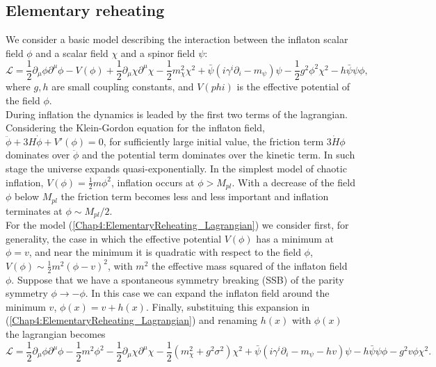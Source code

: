 \documentclass[11pt,a4paper,twoside]{book}
\begin{document}
\subsection{Elementary reheating}
We consider a basic model describing the interaction between the inflaton scalar field $\phi$ and a scalar field 	$\chi$ and a spinor field $\psi$:
\begin{equation}
	\label{Chap4:ElementaryReheating_Lagrangian}
	\mathcal{L}=\frac{1}{2}\partial_{\mu}\phi\partial^{\mu}{\phi} - V(\phi) +\frac{1}{2}\partial_{\mu}\chi\partial^{\mu}\chi -\frac{1}{2}m^{2}_{\chi}\chi^{2} + \bar{\psi}(i\gamma^{i}\partial_{i} - m_{\psi})\psi - \frac{1}{2}g^{2}\phi^{2}\chi^{2} - h\bar{\psi}\psi \phi,
\end{equation} 
where $ g,h $ are small coupling constants, and $ V(phi) $ is the effective potential of the field $\phi$. \\
During inflation the dynamics is leaded by the first two terms of the lagrangian. Considering the Klein-Gordon equation  for the inflaton field, $ \ddot{\phi} + 3H\dot{\phi} + V'(\phi) = 0 $, for sufficiently large initial value, the friction term $ 3\dot{H}\phi $ dominates over $\ddot{\phi}$ and the potential term dominates over the kinetic term. In such stage the universe expands quasi-exponentially. In the simplest model of chaotic inflation, $ V(\phi)=\frac{1}{2}m\phi^{2} $, inflation occurs at $\phi > M_{pl}$. With a decrease of the field $ \phi $ below $ M_{pl} $ the friction term becomes less and less important and inflation terminates at $ \phi \sim M_{pl}/2 $.\\
For the model (\ref{Chap4:ElementaryReheating_Lagrangian}) we consider first, for generality, the case in which the effective potential $ V(\phi) $ has a minimum at $ \phi = v $, and near the minimum it is quadratic with respect to the field $\phi$, $ V(\phi) \sim \frac{1}{2}m^{2}(\phi-v)^{2} $, with $ m^{2} $ the effective mass squared of the inflaton field $\phi$. Suppose that we have a spontaneous symmetry breaking (SSB) of the parity symmetry $ \phi  \rightarrow -\phi$. In this case we can expand the inflaton field around the minimum $ v $, $ \phi(x)=v + h(x)  $. Finally, substituing this expansion in (\ref{Chap4:ElementaryReheating_Lagrangian}) and renaming $ h(x) $ with $\phi(x)$ the lagrangian becomes
\begin{equation}
	\label{Chap4:ElementaryReheating_LafterSSB}
	\mathcal{L}=\frac{1}{2}\partial_{\mu}\phi\partial^{\mu}\phi -\frac{1}{2}m^{2}\phi^{2} - \frac{1}{2}\partial_{\mu}\chi\partial^{\mu}\chi -\frac{1}{2}(m^{2}_{\chi} +g^{2}\sigma^{2})\chi^{2} + \bar{\psi}(i\gamma^{i}\partial_{i} - m_{\psi} - hv )\psi  - h\bar{\psi}\psi\phi -g^{2}v\phi\chi^{2}.
\end{equation}
\end{document}
